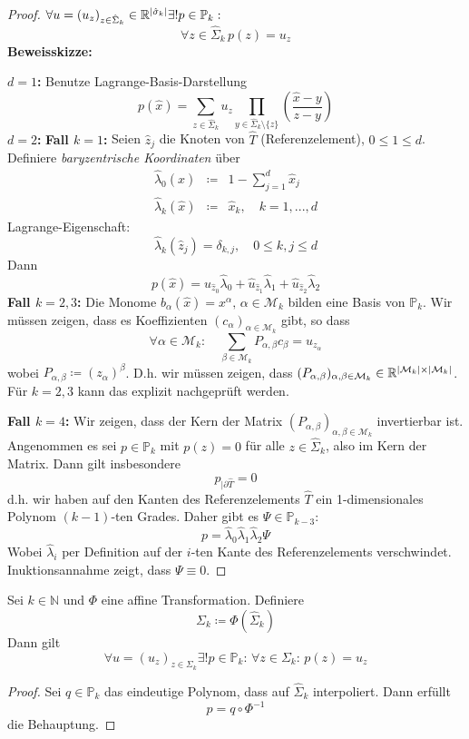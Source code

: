 \documentclass[../skript.tex]{subfiles}
\begin{document}
\begin{proof}
	$\forall u = (u_z)_{z\in\hat{\Sigma}_k}\in\mathbb{R}^{\vert\hat{\sigma}_k\vert}\exists! p\in \mathbb{P}_k:$
	\[
		\forall z\in\hat{\Sigma}_k\,p(z) = u_z
	\]
	\textbf{Beweisskizze: }\par
	\textbf{$d=1$: } Benutze Lagrange-Basis-Darstellung
	\[
		p(\hat{x}) = \sum_{z\in\hat{\Sigma}_k}u_z\prod_{y\in\hat{\Sigma}_k\setminus\{z\}}\left(\frac{\hat{x}-y}{z-y}\right)
	\]
	\textbf{$d=2$: } \textbf{Fall $k=1$: } Seien $\hat{z}_j$ die Knoten von $\hat{T}$ (Referenzelement), $0\leq 1\leq d$. Definiere \emph{baryzentrische Koordinaten} über
	\begin{eqnarray*}
		\hat{\lambda}_0(\hat{x})&\coloneqq& 1-\sum_{j=1}^d\hat{x}_j\\
		\hat{\lambda}_k(\hat{x})&\coloneqq& \hat{x}_k,\quad k=1,...,d
	\end{eqnarray*}
	Lagrange-Eigenschaft:
	\[
		\hat{\lambda}_k(\hat{z}_j) = \delta_{k,j},\quad 0\leq k,j\leq d
	\]
	Dann
	\[
		p(\hat{x}) = u_{\hat{z}_0}\hat{\lambda}_0 + \hat{u}_{\hat{z}_1}\hat{\lambda}_1 + \hat{u}_{\hat{z}_2}\hat{\lambda}_2 
	\]
	\textbf{Fall $k=2,3$: } Die Monome $b_\alpha(\hat{x}) = x^\alpha,\,\alpha\in\mathcal{M}_k$ bilden eine Basis von $\mathbb{P}_k$. Wir müssen zeigen, dass es Koeffizienten $(c_\alpha)_{\alpha\in\mathcal{M}_k}$ gibt, so dass 
	\[
		\forall\alpha\in\mathcal{M}_k:\quad\sum_{\beta\in\mathcal{M}_k} P_{\alpha,\beta}c_\beta = u_{z_\alpha}
	\] 
	wobei $P_{\alpha,\beta}\coloneqq (z_\alpha)^\beta$. D.h. wir müssen zeigen, dass $(P_{\alpha,\beta})_{\alpha,\beta\in\mathcal{M}_k}\in\mathbb{R}^{\vert\mathcal{M}_k\vert\times\vert\mathcal{M}_k\vert}$. Für $k=2,3$ kann das explizit nachgeprüft werden.\par
	\textbf{Fall $k=4$: } Wir zeigen, dass der Kern der Matrix $( P_{\alpha,\beta})_{\alpha,\beta\in\mathcal{M}_k}$ invertierbar ist. Angenommen es sei $p\in\mathbb{P}_k$ mit $p(z) = 0$ für alle $z\in\hat{\Sigma}_k$, also im Kern der Matrix. Dann gilt insbesondere
	\[
		p_{\vert\partial\hat{T}} = 0
	\]
	d.h. wir haben auf den Kanten des Referenzelements $\hat{T}$ ein 1-dimensionales Polynom $(k-1)$-ten Grades. Daher gibt es $\Psi\in\mathbb{P}_{k-3}$:
	\[
		p = \hat{\lambda}_0\hat{\lambda}_1\hat{\lambda}_2\Psi
	\]
	Wobei $\hat{\lambda}_i$ per Definition auf der $i$-ten Kante des Referenzelements verschwindet. Inuktionsannahme zeigt, dass $\Psi\equiv 0$.
\end{proof}

\begin{corollary}\label{cor:c2e3s7}
	Sei $k\in\mathbb{N}$ und $\Phi$ eine affine Transformation. Definiere 
	\[
		\Sigma_k \coloneqq \Phi\left(\hat{\Sigma}_k\right)
	\]
	Dann gilt
	\[
		\forall u=(u_z)_{z\in\Sigma_k}\exists ! p \in \mathbb{P}_k:\,\forall z\in\Sigma_k:\,p(z)=u_z
	\]
\end{corollary}
\begin{proof}
	Sei $q\in\mathbb{P}_k$ das eindeutige Polynom, dass auf $\hat{\Sigma}_k$ interpoliert. Dann erfüllt
	\[
		p = q\circ\Phi^{-1}
	\] 
	die Behauptung. 
\end{proof}
\end{document}

